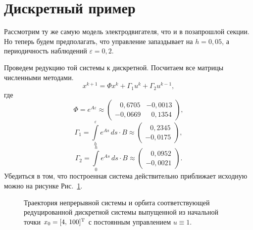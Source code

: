 \section{Дискретный пример}
Рассмотрим ту же самую модель электродвигателя, что и в позапрошлой секции. Но теперь будем предполагать, что управление запаздывает на $h = 0,\!05$, а периодичность наблюдений $\varepsilon = 0,\!2$.

Проведем редукцию той системы к дискретной. Посчитаем все матрицы численными методами.
$$
x^{k+1} = \Phi x^k + \Gamma_1 u^k + \Gamma_2 u^{k-1},
$$
где
$$
        \Phi = e^{A\varepsilon} \approx \begin{pmatrix}
\;\;\,0,\!6705 & -0,\!0013 \\
-0,\!0669 & \;\;\,0,\!1354
        \end{pmatrix},
$$
$$
        \Gamma_1 = \int\limits_{h}^{\varepsilon}
        e^{As}\,ds \cdot B \approx
\begin{pmatrix}
\;\;\,0,\!2345 \\
-0,\!0175
\end{pmatrix}, 
$$
$$
        \Gamma_2 = \int\limits_{0}^{h}
        e^{As}\,ds \cdot B \approx
        \begin{pmatrix}
\;\;\,0,\!0952 \\
-0,\!0021
        \end{pmatrix}.
$$
Убедиться в том, что построенная система действительно приближает исходную можно на рисунке Рис.~\ref{img:cont-and-disc}.
\begin{figure}[bh]
        \noindent{}
        \caption{Траектория непрерывной системы и орбита соответствующей редуцированной дискретной системы выпущенной из начальной точки $x_0 = [4,\, 100]^\mathrm{T}$ с постоянным управлением $u \equiv 1$.}
        \label{img:cont-and-disc}
\end{figure}

